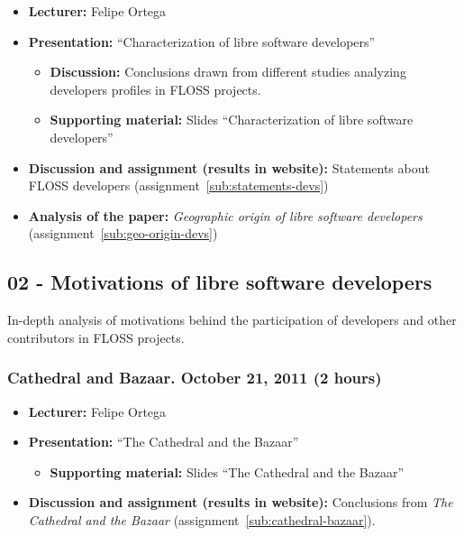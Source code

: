 \documentclass[a4paper]{article}
\begin{document}
\begin{itemize}
\item \textbf{Lecturer:} Felipe Ortega
\item \textbf{Presentation:} ``Characterization of libre software developers''
  \begin{itemize}
  \item \textbf{Discussion:} Conclusions drawn from different studies analyzing developers profiles in FLOSS projects.
  \item \textbf{Supporting material:} Slides ``Characterization of libre software developers''
  \end{itemize}
\item \textbf{Discussion and assignment (results in website):} Statements about FLOSS developers (assignment~\ref{sub:statements-devs})
\item \textbf{Analysis of the paper:} \textit{Geographic origin of libre software developers} (assignment~\ref{sub:geo-origin-devs})
\end{itemize}

\subsection{02 - Motivations of libre software developers}

In-depth analysis of motivations behind the participation of developers and other contributors in FLOSS projects.

\subsubsection{Cathedral and Bazaar. October 21, 2011 (2 hours)}

\begin{itemize}
\item \textbf{Lecturer:} Felipe Ortega
\item \textbf{Presentation:} ``The Cathedral and the Bazaar''
  \begin{itemize}
  \item \textbf{Supporting material:} Slides ``The Cathedral and the Bazaar''
  \end{itemize}
\item \textbf{Discussion and assignment (results in website):} Conclusions from \textit{The Cathedral and the Bazaar} (assignment~\ref{sub:cathedral-bazaar}).
\end{itemize}
\end{document}
